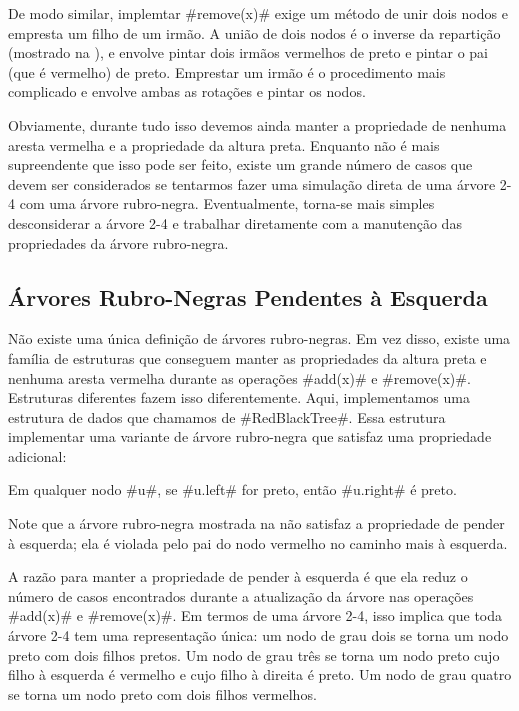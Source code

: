 De modo similar, implemtar 
#remove(x)# exige um método de unir dois nodos e empresta um filho de um irmão.
A união de dois nodos é o inverse da repartição (mostrado na 
), e envolve pintar dois irmãos vermelhos de preto e pintar o pai (que é vermelho) de preto. Emprestar um irmão é o procedimento mais complicado
e envolve ambas as rotações e pintar os nodos.

Obviamente, durante tudo isso devemos ainda manter a propriedade de nenhuma aresta 
vermelha e a propriedade da altura preta. Enquanto não é mais supreendente 
que isso pode ser feito, existe um grande número de casos que devem ser considerados
se tentarmos fazer uma simulação direta de uma 
árvore 2-4 com uma árvore rubro-negra. 
Eventualmente, torna-se mais simples desconsiderar a árvore 2-4 e trabalhar
diretamente com a manutenção das propriedades da árvore rubro-negra.

\subsection{Árvores Rubro-Negras Pendentes à Esquerda}

%
%
Não existe uma única definição de 
árvores rubro-negras. Em vez disso, existe uma família
de estruturas que conseguem manter as propriedades da altura preta
e nenhuma aresta vermelha 
durante as operações #add(x)# e #remove(x)#. Estruturas diferentes fazem isso diferentemente. 
Aqui, implementamos uma estrutura de dados que chamamos de 
#RedBlackTree#.
%
Essa estrutura implementar uma variante de árvore rubro-negra que satisfaz
uma propriedade adicional:
\begin{prp}
  Em qualquer nodo #u#, se #u.left# for preto, então #u.right# é preto. 
\end{prp}
Note que a árvore rubro-negra mostrada na 
  não satisfaz a propriedade de pender 
à esquerda; 
ela é violada pelo pai do nodo vermelho no caminho mais à esquerda.

A razão para manter a propriedade de pender à esquerda é que ela reduz
o número de casos encontrados durante a atualização da árvore nas operações
#add(x)#
e #remove(x)#.  Em termos de uma árvore 2-4, isso implica que toda árvore 2-4 tem uma representação única: um nodo de grau dois se torna um nodo preto com dois filhos pretos.
Um nodo de grau três se torna um nodo preto cujo filho à esquerda é vermelho 
e cujo filho à direita é preto.
Um nodo de grau quatro se torna um nodo preto com dois filhos vermelhos.

